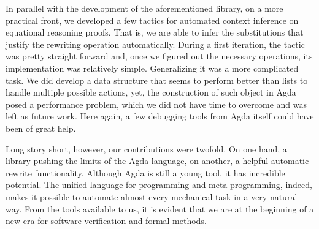 In parallel with the development of the aforementioned library, on a more practical front,
we developed a few tactics for automated context inference on equational reasoning proofs.
That is, we are able to infer the substitutions that justify the rewriting operation automatically.
During a first iteration, the tactic was pretty straight forward and, once we figured out
the necessary  operations, its implementation was relatively simple.
Generalizing it was a more complicated task. We did develop a data structure that 
seems to perform better than lists to handle multiple possible actions, yet, the construction 
of such object in Agda posed a performance problem, which we did not have time to overcome 
and was left as future work. Here again, a few debugging tools from Agda itself could have been of great help.

Long story short, however, our contributions were twofold. On one hand, a library pushing the limits of the 
Agda language, on another, a helpful automatic rewrite functionality.
Although Agda is still a young tool, it has incredible potential. The unified language for
programming and meta-programming, indeed, makes it possible to automate almost every mechanical 
task in a very natural way. From the tools available to us, it is evident that we are at 
the beginning of a new era for software verification and formal methods. 

